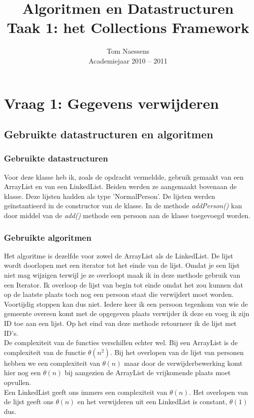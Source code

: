 \documentclass[10pt,a4paper]{report}
\title{Algoritmen en Datastructuren\\ Taak 1: het Collections Framework}
\author{Tom Naessens\\ Academiejaar 2010 -- 2011}
\begin{document}
\maketitle


\section*{Vraag 1: Gegevens verwijderen}
\subsection*{Gebruikte datastructuren en algoritmen}
\subsubsection*{Gebruikte datastructuren}
Voor deze klasse heb ik, zoals de opdracht vermeldde, gebruik gemaakt van een ArrayList en van een LinkedList. Beiden werden ze aangemaakt bovenaan de klasse. Deze lijsten hadden als type 'NormalPerson'. De lijsten werden ge\"instantieerd in de constructor van de klasse. In de methode \textsl{addPerson()} kan door middel van de \textsl{add()} methode een persoon aan de klasse toegevoegd worden.
\subsubsection*{Gebruikte algoritmen}
Het algoritme is dezelfde voor zowel de ArrayList als de LinkedList. De lijst wordt doorlopen met een iterator tot het einde van de lijst. Omdat je een lijst niet mag wijzigen terwijl je ze overloopt maak ik in deze methode gebruik van een Iterator. Ik overloop de lijst van begin tot einde omdat het zou kunnen dat op de laatste plaats toch nog een persoon staat die verwijdert moet worden. Voortijdig stoppen kan dus niet. Iedere keer ik een persoon tegenkom van wie de gemeente overeen komt met de opgegeven plaats verwijder ik deze en voeg ik zijn ID toe aan een lijst. Op het eind van deze methode retourneer ik de lijst met ID's.\\

De complexiteit van de functies verschillen echter wel. 
Bij een ArrayList is de complexiteit van de functie $\theta(n^2)$. 
Bij het overlopen van de lijst van personen hebben we een complexiteit van $\theta(n)$ maar door de verwijderbewerking komt hier nog een $\theta(n)$ bij aangezien de ArrayList de vrijkomende plaats moet opvullen.\\
Een LinkedList geeft ons immers een complexiteit van $\theta(n)$. Het overlopen van de lijst geeft ons $\theta(n)$ en het verwijderen uit een LinkedList is constant, $\theta(1)$ dus.
\end{document}
